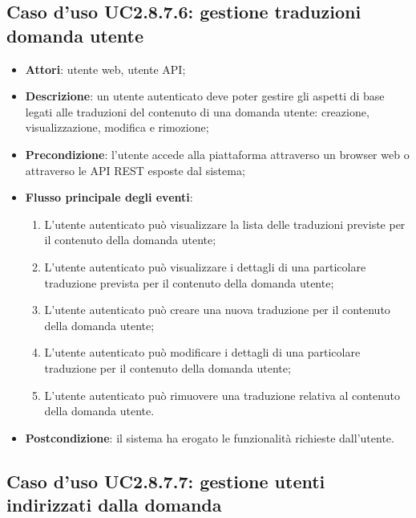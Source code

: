 \subsection{Caso d'uso UC2.8.7.6: gestione traduzioni domanda utente}
\begin{itemize}
\item \textbf{Attori}: utente web, utente API;
\item \textbf{Descrizione}: un utente autenticato deve poter gestire gli aspetti di base legati alle traduzioni del contenuto di una domanda utente: creazione, visualizzazione, modifica e rimozione; 
      \item \textbf{Precondizione}: l'utente accede alla piattaforma attraverso un browser web o attraverso le API REST esposte dal sistema;

        \item \textbf{Flusso principale degli eventi}:
          \begin{enumerate}
          \item L'utente autenticato può visualizzare la lista delle traduzioni previste per il contenuto della domanda utente;
          \item L'utente autenticato può visualizzare i dettagli di una particolare traduzione prevista per il contenuto della domanda utente;
          \item L'utente autenticato può creare una nuova traduzione per il contenuto della domanda utente;
          \item L'utente autenticato può modificare i dettagli di una particolare traduzione per il contenuto della domanda utente;
          \item L'utente autenticato può rimuovere una traduzione relativa al contenuto della domanda utente.

      \end{enumerate}
    \item \textbf{Postcondizione}: il sistema ha erogato le funzionalità richieste dall'utente.
  \end{itemize}
\hypertarget{UC2.8.7.7}{}
\subsection{Caso d'uso UC2.8.7.7: gestione utenti indirizzati dalla domanda}

